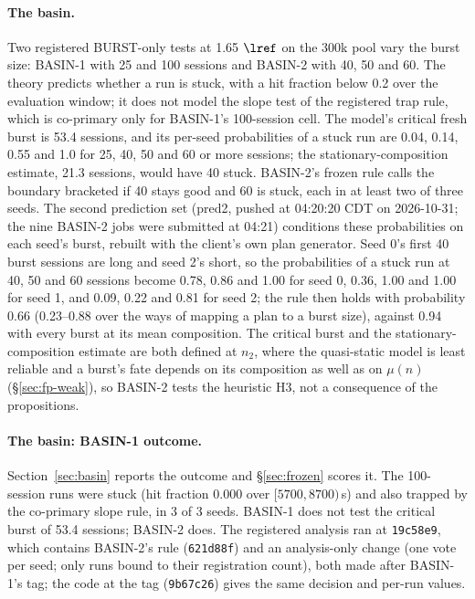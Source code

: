\paragraph{The basin.} Two registered BURST-only tests at 1.65 $\lref$ on the 300k pool vary the burst size: BASIN-1 with 25 and 100 sessions and BASIN-2 with 40, 50 and 60. The theory predicts whether a run is stuck, with a hit fraction below 0.2 over the evaluation window; it does not model the slope test of the registered trap rule, which is co-primary only for BASIN-1's 100-session cell. The model's critical fresh burst is 53.4 sessions, and its per-seed probabilities of a stuck run are 0.04, 0.14, 0.55 and 1.0 for 25, 40, 50 and 60 or more sessions; the stationary-composition estimate, 21.3 sessions, would have 40 stuck. BASIN-2's frozen rule calls the boundary bracketed if 40 stays good and 60 is stuck, each in at least two of three seeds. The second prediction set (pred2, pushed at 04:20:20 CDT on 2026-10-31; the nine BASIN-2 jobs were submitted at 04:21) conditions these probabilities on each seed's burst, rebuilt with the client's own plan generator. Seed 0's first 40 burst sessions are long and seed 2's short, so the probabilities of a stuck run at 40, 50 and 60 sessions become 0.78, 0.86 and 1.00 for seed 0, 0.36, 1.00 and 1.00 for seed 1, and 0.09, 0.22 and 0.81 for seed 2; the rule then holds with probability 0.66 (0.23--0.88 over the ways of mapping a plan to a burst size), against 0.94 with every burst at its mean composition. The critical burst and the stationary-composition estimate are both defined at $n_2$, where the quasi-static model is least reliable and a burst's fate depends on its composition as well as on $\mu(n)$ (\S\ref{sec:fp-weak}), so BASIN-2 tests the heuristic H3, not a consequence of the propositions.

\paragraph{The basin: BASIN-1 outcome.} Section~\ref{sec:basin} reports the outcome and \S\ref{sec:frozen} scores it. The 100-session runs were stuck (hit fraction 0.000 over $[5700,8700)$\,s) and also trapped by the co-primary slope rule, in 3 of 3 seeds. BASIN-1 does not test the critical burst of 53.4 sessions; BASIN-2 does. The registered analysis ran at \texttt{19c58e9}, which contains BASIN-2's rule (\texttt{621d88f}) and an analysis-only change (one vote per seed; only runs bound to their registration count), both made after BASIN-1's tag; the code at the tag (\texttt{9b67c26}) gives the same decision and per-run values.

